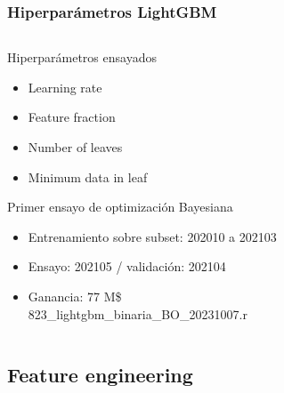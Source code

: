 \documentclass[aspectratio=169]{beamer} %
\begin{document}
\begin{frame}
  \frametitle{Hiperparámetros LightGBM}
  \begin{columns}[onlytextwidth]
    \begin{column}{.6\textwidth}
      \begin{block}{Hiperparámetros ensayados}
        \begin{itemize}
          \item Learning rate
          \item Feature fraction
          \item Number of leaves
          \item Minimum data in leaf
        \end{itemize}
      \end{block}
      \begin{block}{Primer ensayo de optimización Bayesiana}
       \begin{itemize}
          \item Entrenamiento sobre subset: 202010 a 202103
          \item Ensayo: 202105 / validación: 202104
          \item Ganancia: 77 M\$\\
            {\tiny 823\_lightgbm\_binaria\_BO\_20231007.r}
		    \end{itemize}
      \end{block}
    \end{column}
  \end{columns}
\end{frame}





\subsection{Feature engineering}
\end{document}
